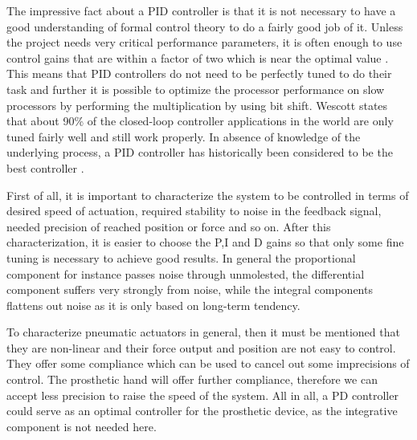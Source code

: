 \documentclass[main]{subfiles}
\begin{document}
\begin{comment}By setting one of the three tuning factors to zero, it is possible to make a PI or PD controller (which have shown to be particularly useful). The controller highly depends on a proper input sampling rate which should at least not vary more than 20\% over a sample of 10 and based on Wescott in ''PID without a PhD''\cite{PID} each sample should only vary $\pm$1-5\% of the correct sample time. A rule of thumb for digital control systems is that the sample time should be between $\frac{1}{10}$th and $\frac{1}{100}$th of the desired system settling time. System settling time is the amount of time from the moment the drive comes out of saturation until the control system has effectively settled out.\\
\end{comment}
The impressive fact about a PID controller is that it is not necessary to have a good understanding of formal control theory to do a fairly good job of it. Unless the project needs very critical performance parameters, it is often enough to use control gains that are within a factor of two which is near the optimal value \cite{PID}. This means that PID controllers do not need to be perfectly tuned to do their task and further it is possible to optimize the processor performance on slow processors by performing the multiplication by using bit shift. Wescott states that about 90\% of the closed-loop controller applications in the world are only tuned fairly well and still work properly. In absence of knowledge of the underlying process, a PID controller has historically been considered to be the best controller \cite{Control-Engineering}.

First of all, it is important to characterize the system to be controlled in terms of desired speed of actuation, required stability to noise in the feedback signal, needed precision of reached position or force and so on. After this characterization, it is easier to choose the P,I and D gains so that only some fine tuning is necessary to achieve good results. In general the proportional component for instance passes noise through unmolested, the differential component suffers very strongly from noise, while the integral components flattens out noise as it is only based on long-term tendency.

To characterize pneumatic actuators in general, then it must be mentioned that they are non-linear and their force output and position are not easy to control. They offer some compliance which can be used to cancel out some imprecisions of control. The prosthetic hand will offer further compliance, therefore we can accept less precision to raise the speed of the system. All in all, a PD controller could serve as an optimal controller for the prosthetic device, as the integrative component is not needed here.
\end{document}
